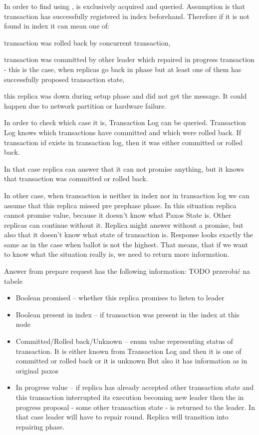 In order to find \paxosRoundId using \txState, \txIndex is exclusively acquired and queried. Assumption is that transaction has successfully registered in index beforehand. Therefore if it is not found in index it can mean one of:
\begin{enumerate*}
\item transaction was rolled back by concurrent transaction,
\item transaction was committed by other leader which repaired in progress transaction - this is the case, when replicas go back in phase but at least one of them has successfully proposed transaction state,
\item this replica was down during setup phase and did not get the message. It could happen due to network partition or hardware failure.
\end{enumerate*}


In order to check which case it is, Transaction Log can be queried. Transaction Log knows which transactions have committed and which were rolled back. If transaction id exists in transaction log, then it was either committed or rolled back.


In that case replica can answer that it can not promise anything, but it knows that transaction was committed or rolled back.


In other case, when transaction is neither in index nor in transaction log we can assume that this replica missed pre prephase phase. In this situation replica cannot promise value, because it doesn’t know what Paxos State is. Other replicas can continue without it. Replica might answer without a promise, but also that it doesn’t know what state of transaction is. Response looks exactly the same as in the case when ballot is not the highest. That means, that if we want to know what the situation really is, we need to return more information.


Answer from prepare request has the following information:
TODO przerobić na tabele
\begin{itemize}
\item Boolean promised -- whether this replica promises to listen to leader
\item Boolean present in index -- if transaction was present in the index at this node
\item Committed/Rolled back/Unknown -- enum value representing status of transaction. It is either known from Transaction Log and then it is one of committed or rolled back or it is unknown
But also it has information as in original paxos
\item In progress value -- if replica has already accepted other transaction state and this transaction interrupted its execution becoming new leader then the in progress proposal - some other transaction state - is returned to the leader. In that case leader will have to repair \mpt round. Replica will transition into repairing phase.
\end{itemize}


